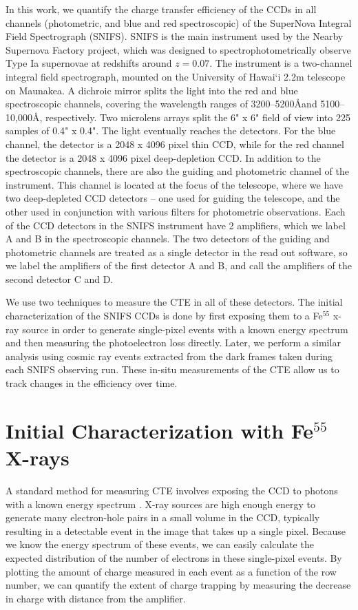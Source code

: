 In this work, we quantify the charge transfer efficiency of the CCDs in all channels (photometric, and blue and red spectroscopic) of the SuperNova Integral Field Spectrograph (SNIFS). SNIFS is the main instrument used by the Nearby Supernova Factory \citep[SNfactory, ]{aldering_overview_2002} project, which was designed to spectrophotometrically observe Type Ia supernovae at redshifts around $z=0.07$. The instrument is a two-channel integral field spectrograph, mounted on the University of Hawai`i 2.2m telescope on Maunakea. A dichroic mirror splits the light into the red and blue spectroscopic channels, covering the wavelength ranges of 3200–5200\AA and 5100–10,000\AA, respectively. Two microlens arrays split the 6" x 6" field of view into 225 samples of 0.4" x 0.4". The light eventually reaches the detectors. For the blue channel, the detector is a 2048 x 4096 pixel thin CCD, while for the red channel the detector is a 2048 x 4096 pixel deep-depletion CCD. In addition to the spectroscopic channels, there are also the guiding and photometric channel of the instrument. This channel is located at the focus of the telescope, where we have two deep-depleted CCD detectors -- one used for guiding the telescope, and the other used in conjunction with various filters for photometric observations. Each of the CCD detectors in the SNIFS instrument have 2 amplifiers, which we label A and B in the spectroscopic channels. The two detectors of the guiding and photometric channels are treated as a single detector in the read out software, so we label the amplifiers of the first detector A and B, and call the amplifiers of the second detector C and D. 

We use two techniques to measure the CTE in all of these detectors. The initial characterization of the SNIFS CCDs is done by first exposing them to a Fe$^{55}$ x-ray source in order to generate single-pixel events with a known energy spectrum and then measuring the photoelectron loss directly. Later, we perform a similar analysis using cosmic ray events extracted from the dark frames taken during each SNIFS observing run. These in-situ measurements of the CTE allow us to track changes in the efficiency over time.

\section{Initial Characterization with \texorpdfstring{Fe$^{55}$}{Fe-55} X-rays}
A standard method for measuring CTE involves exposing the CCD to photons with a known energy spectrum \citep{janesick_scientific_2001}. X-ray sources are high enough energy to generate many electron-hole pairs in a small volume in the CCD, typically resulting in a detectable event in the image that takes up a single pixel. Because we know the energy spectrum of these events, we can easily calculate the expected distribution of the number of electrons in these single-pixel events. By plotting the amount of charge measured in each event as a function of the row number, we can quantify the extent of charge trapping by measuring the decrease in charge with distance from the amplifier.

